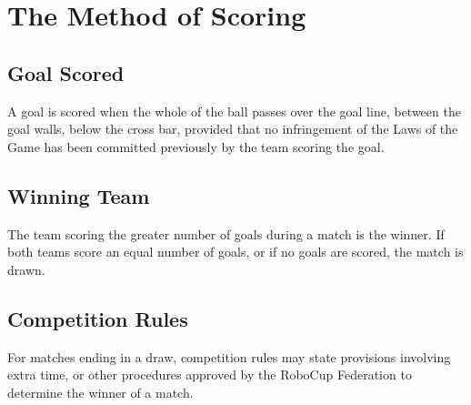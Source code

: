\section{The Method of Scoring}\label{sec:method-of-scoring}

\subsection{Goal Scored}
A goal is scored when the whole of the ball passes over the goal line, between the goal walls, below the cross bar, provided that no infringement of the Laws of the Game has been committed previously by the team scoring the goal.

\subsection{Winning Team}
The team scoring the greater number of goals during a match is the winner.
If both teams score an equal number of goals, or if no goals are scored, the match is drawn.

\subsection{Competition Rules}
For matches ending in a draw, competition rules may state provisions involving extra time, or other procedures approved by the RoboCup Federation to determine the winner of a match.
